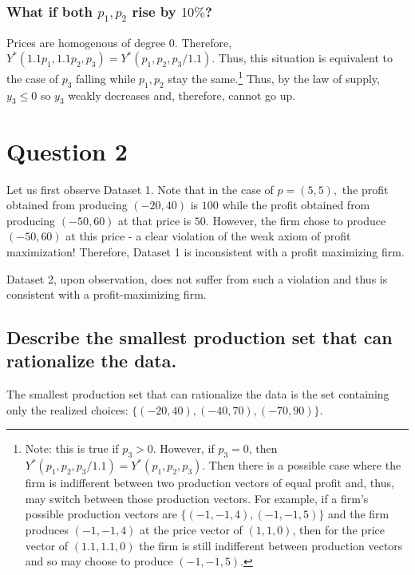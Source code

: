 \documentclass[11pt]{article} %
\begin{document}
\subsubsection{What if both $p_1,p_2$ rise by $10\%$?}
Prices are homogenous of degree 0. Therefore, $Y^{*}(1.1 p_1,1.1 p_2,p_3) = Y^{*}(p_1,p_2,p_3 /1.1) $. Thus, this situation is equivalent to the case of $p_3$ falling while $p_1,p_2$ stay the same.\footnote{Note: this is true if $p_3>0$. However, if $p_3 = 0$, then $ Y^{*}(p_1,p_2,p_3 /1.1)= Y^{*}(p_1,p_2,p_3)  $. Then there is a possible case where the firm is indifferent between two production vectors of equal profit and, thus, may switch between those production vectors. For example, if a firm's possible production vectors are $\{  (-1,-1,4) , (-1,-1,5)\}$ and the firm produces $(-1,-1,4)$ at the price vector of $(1,1,0)$, then for the price vector of $(1.1,1.1,0)$ the firm is still indifferent between production vectors and so may choose to produce $(-1,-1,5).$} Thus, by the law of supply, $y_3 \leq 0$ so $y_3$ weakly decreases and, therefore, cannot go up.

\section{Question 2}
Let us first observe Dataset 1. Note that in the case of $p=(5,5),$ the profit obtained from producing $(-20,40)$ is $100$ while the profit obtained from producing $(-50,60)$ at that price is $50$. However, the firm chose to produce $(-50,60)$ at this price - a clear violation of the weak axiom of profit maximization! Therefore, Dataset 1 is inconsistent with a profit maximizing firm.

Dataset 2, upon observation, does not suffer from such a violation and thus is consistent with a profit-maximizing firm. 
\subsection{Describe the smallest production set that can rationalize the data.}
The smallest production set that can rationalize the data is the set containing only the realized choices: $\{ (-20,40),(-40,70),(-70,90)\}$.
\end{document}
